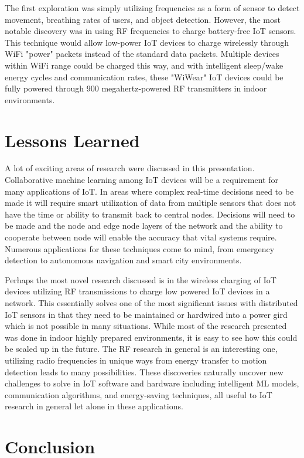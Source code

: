 \documentclass[journal,onecolumn]{IEEEtran}
\begin{document}
The first exploration was simply utilizing frequencies as a form of sensor to detect movement, breathing rates of users, and object detection. However, the most notable discovery was in using RF frequencies to charge battery-free IoT sensors. This technique would allow low-power IoT devices to charge wirelessly through WiFi "power" packets instead of the standard data packets. Multiple devices within WiFi range could be charged this way, and with intelligent sleep/wake energy cycles and communication rates, these "WiWear" IoT devices could be fully powered through 900 megahertz-powered RF transmitters in indoor environments. 

\section{Lessons Learned}

A lot of exciting areas of research were discussed in this presentation. Collaborative machine learning among IoT devices will be a requirement for many applications of IoT. In areas where complex real-time decisions need to be made it will require smart utilization of data from multiple sensors that does not have the time or ability to transmit back to central nodes. Decisions will need to be made and the node and edge node layers of the network and the ability to cooperate between node will enable the accuracy that vital systems require. Numerous applications for these techniques come to mind, from emergency detection to autonomous navigation and smart city environments. 

Perhaps the most novel research discussed is in the wireless charging of IoT devices utilizing RF transmissions to charge low powered IoT devices in a network. This essentially solves one of the most significant issues with distributed IoT sensors in that they need to be maintained or hardwired into a power gird which is not possible in many situations. While most of the research presented was done in indoor highly prepared environments, it is easy to see how this could be scaled up in the future. The RF research in general is an interesting one, utilizing radio frequencies in unique ways from energy transfer to motion detection leads to many possibilities. These discoveries naturally uncover new challenges to solve in IoT software and hardware including intelligent ML models, communication algorithms, and energy-saving techniques, all useful to IoT research in general let alone in these applications. 

\section{Conclusion}
\end{document}
